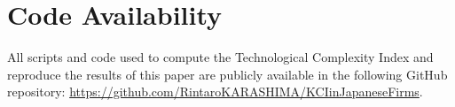 \section*{Code Availability}
{}
\label{section:code_availability}

All scripts and code used to compute the Technological Complexity Index and reproduce the results of this paper are publicly available in the following GitHub repository: \url{https://github.com/RintaroKARASHIMA/KCIinJapaneseFirms}.  